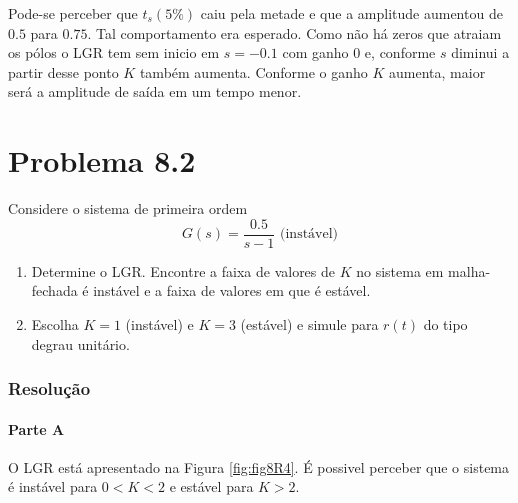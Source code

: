 \documentclass[
]{book}
\providecommand{\tightlist}{%
  \setlength{\itemsep}{0pt}\setlength{\parskip}{0pt}}
\theoremstyle{definition}
\theoremstyle{definition}
\theoremstyle{definition}
\theoremstyle{remark}
\begin{document}
Pode-se perceber que \(t_s(5\%)\) caiu pela metade e que a amplitude aumentou de \(0.5\) para \(0.75\). Tal comportamento era esperado. Como não há zeros que atraiam os pólos o LGR tem sem inicio em \(s = -0.1\) com ganho 0 e, conforme \(s\) diminui a partir desse ponto \(K\) também aumenta. Conforme o ganho \(K\) aumenta, maior será a amplitude de saída em um tempo menor.

\hypertarget{problema-8.2}{%
\section*{Problema 8.2}\label{problema-8.2}}

Considere o sistema de primeira ordem
\[
G(s) = \frac{0.5}{s-1} \text{ (instável)}
\]

\begin{enumerate}
\def\labelenumi{\alph{enumi}.}
\tightlist
\item
  Determine o LGR. Encontre a faixa de valores de \(K\) no sistema em malha-fechada é instável e a faixa de valores em que é estável.
\item
  Escolha \(K=1\) (instável) e \(K=3\) (estável) e simule para \(r(t)\) do tipo degrau unitário.
\end{enumerate}

\hypertarget{resoluuxe7uxe3o-23}{%
\subsubsection*{Resolução}\label{resoluuxe7uxe3o-23}}

\hypertarget{parte-a-10}{%
\paragraph{Parte A}\label{parte-a-10}}

O LGR está apresentado na Figura \ref{fig:fig8R4}. É possivel perceber que o sistema é instável para \(0 < K < 2\) e estável para \(K > 2\).
\end{document}
